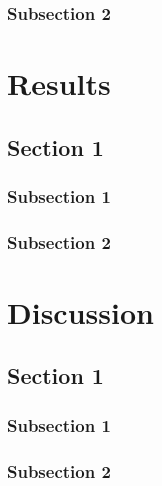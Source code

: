 \documentclass[a4paper,justified,titlepage,twoside,nobib,symmetric]{tufte-book}
\begin{document}
\subsection{Subsection 2}
\blindtext

\chapter{Results}
\blindtext
\section{Section 1}
\blindtext
\subsection{Subsection 1}
\blindtext
\subsection{Subsection 2}
\blindtext

\chapter{Discussion}
\blindtext
\section{Section 1}
\blindtext
\subsection{Subsection 1}
\blindtext
\subsection{Subsection 2}
\blindtext


\backmatter
\ChaptersOutsidePart

\ChaptersInsidePart
\end{document}
